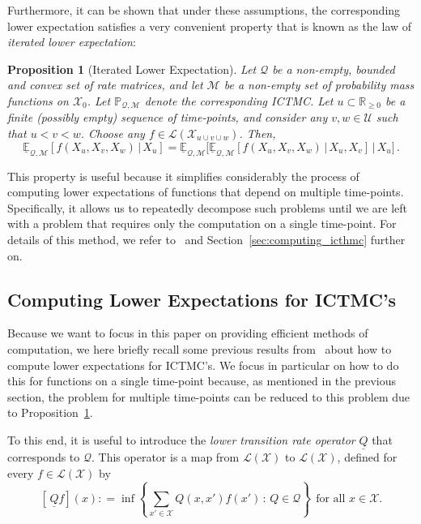 \documentclass[3p]{elsarticle}
\newtheorem{proposition}[theorem]{Proposition}
\newcommand{\reals}{\mathbb{R}}
\newcommand{\realsnonneg}{\reals_{\geq 0}}
\newcommand{\states}{\mathcal{X}}
\newcommand{\lexp}{\underline{\mathbb{E}}_{\rateset,\mathcal{M}}}
\newcommand{\gambles}{\mathcal{L}}
\newcommand{\gamblesX}{\gambles(\states)}
\newcommand{\rateset}{\mathcal{Q}}
\newcommand{\lrate}{\underline{Q}}
\newcommand{\coloneqq}{:\!=}
\begin{document}
Furthermore, it can be shown that under these assumptions, the corresponding lower expectation satisfies a very convenient property that is known as the law of \emph{iterated lower expectation}: 
\begin{proposition}[Iterated Lower Expectation]\cite[Theorem 6.5]{krak2016ictmc}\label{lemma:iterated_lower}
Let $\rateset$ be a non-empty, bounded and convex set of rate matrices, and let $\mathcal{M}$ be a non-empty set of probability mass functions on $\states_0$. Let $\mathbb{P}_{\rateset,\mathcal{M}}$ denote the corresponding ICTMC.
Let $u\subset\realsnonneg$ be a finite (possibly empty) sequence of time-points, and consider any $v,w\in\mathcal{U}$ such that $u<v<w$. Choose any $f\in\gambles(\states_{u\cup v\cup w})$. Then,
\begin{equation*}
\lexp[f(X_u,X_v,X_w)\,\vert\,X_u] = \lexp\bigl[\lexp[f(X_u,X_v,X_w)\,\vert\,X_u,X_v]\,\vert\,X_u\bigr]\,.
\end{equation*}
\end{proposition}
This property is useful because it simplifies considerably the process of computing lower expectations of functions that depend on multiple time-points. Specifically, it allows us to repeatedly decompose such problems until we are left with a problem that requires only the computation on a single time-point. For details of this method, we refer to~\cite[Section 9.2]{krak2016ictmc} and Section~\ref{sec:computing_icthmc} further on.


\subsection{Computing Lower Expectations for ICTMC's}\label{subsec:ICTMC_computations}

Because we want to focus in this paper on providing efficient methods of computation, we here briefly recall some previous results from~\citet{krak2016ictmc} about how to compute lower expectations for ICTMC's. We focus in particular on how to do this for functions on a single time-point because, as mentioned in the previous section, the problem for multiple time-points can be reduced to this problem due to Proposition~\ref{lemma:iterated_lower}.

To this end, it is useful to introduce the \emph{lower transition rate operator} $\lrate$ that corresponds to $\rateset$. This operator is a map from $\gamblesX$ to $\gamblesX$, defined for every $f\in\gamblesX$ by
\begin{equation}\label{eq:lower_rate_is_inf}
\left[\,\lrate f\right](x) \coloneqq \inf\left\{ \sum_{x'\in\states}Q(x,x')f(x')\,:\, Q\in\rateset \right\}
~~\text{for all $x\in\states$}.
\end{equation}
\end{document}
